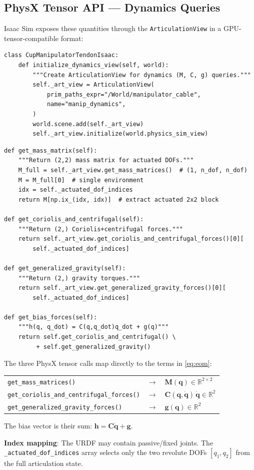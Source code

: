\documentclass[11pt,a4paper]{article}
\newcommand{\bq}{\bm{q}}
\newcommand{\bdq}{\dot{\bm{q}}}
\newcommand{\bM}{\bm{M}}
\newcommand{\bh}{\bm{h}}
\begin{document}
\subsection{PhysX Tensor API --- Dynamics Queries}

Isaac Sim exposes these quantities through the \texttt{ArticulationView} in a GPU-tensor-compatible format:

\begin{lstlisting}[caption={Dynamics initialization --- \texttt{robots/cup\_manipulator\_tendon\_isaac.py}}]
class CupManipulatorTendonIsaac:
    def initialize_dynamics_view(self, world):
        """Create ArticulationView for dynamics (M, C, g) queries."""
        self._art_view = ArticulationView(
            prim_paths_expr="/World/manipulator_cable",
            name="manip_dynamics",
        )
        world.scene.add(self._art_view)
        self._art_view.initialize(world.physics_sim_view)
\end{lstlisting}

\begin{lstlisting}[caption={Mass matrix and bias forces --- \texttt{robots/cup\_manipulator\_tendon\_isaac.py}}]
def get_mass_matrix(self):
    """Return (2,2) mass matrix for actuated DOFs."""
    M_full = self._art_view.get_mass_matrices()  # (1, n_dof, n_dof)
    M = M_full[0]  # single environment
    idx = self._actuated_dof_indices
    return M[np.ix_(idx, idx)]  # extract actuated 2x2 block

def get_coriolis_and_centrifugal(self):
    """Return (2,) Coriolis+centrifugal forces."""
    return self._art_view.get_coriolis_and_centrifugal_forces()[0][
        self._actuated_dof_indices]

def get_generalized_gravity(self):
    """Return (2,) gravity torques."""
    return self._art_view.get_generalized_gravity_forces()[0][
        self._actuated_dof_indices]

def get_bias_forces(self):
    """h(q, q_dot) = C(q,q_dot)q_dot + g(q)"""
    return self.get_coriolis_and_centrifugal() \
         + self.get_generalized_gravity()
\end{lstlisting}

\begin{codemath}
The three PhysX tensor calls map directly to the terms in \eqref{eq:eom}:

\begin{tabular}{lll}
\texttt{get\_mass\_matrices()} & $\to$ & $\bM(\bq) \in \mathbb{R}^{2\times 2}$ \\
\texttt{get\_coriolis\_and\_centrifugal\_forces()} & $\to$ & $\bm{C}(\bq,\bdq)\,\bdq \in \mathbb{R}^2$ \\
\texttt{get\_generalized\_gravity\_forces()} & $\to$ & $\bm{g}(\bq) \in \mathbb{R}^2$ \\
\end{tabular}

\medskip
The bias vector is their sum: $\bh = \bm{C}\bdq + \bm{g}$.

\textbf{Index mapping}: The URDF may contain passive/fixed joints. The \texttt{\_actuated\_dof\_indices} array selects only the two revolute DOFs $[q_1, q_2]$ from the full articulation state.
\end{codemath}
\end{document}
